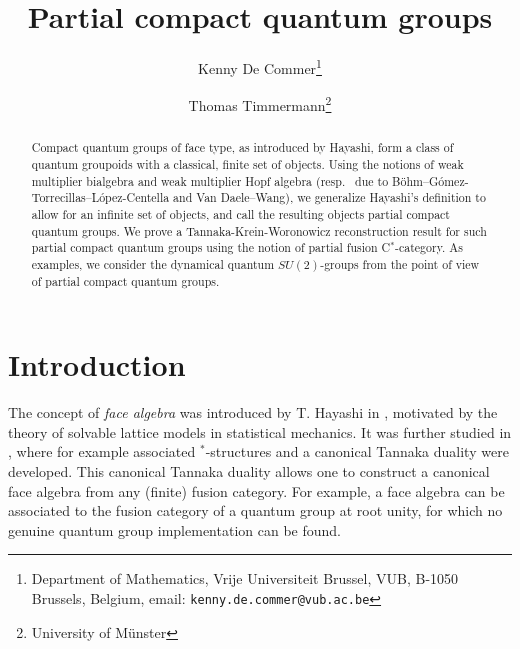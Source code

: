 \documentclass[10pt]{article}
\date{}
\theoremstyle{definition}
\numberwithin{equation}{section}
\begin{document}
\title{Partial compact quantum groups}

\author{Kenny De Commer\thanks{Department of Mathematics, Vrije Universiteit Brussel, VUB, B-1050 Brussels, Belgium, email: {\tt kenny.de.commer@vub.ac.be}}
\and Thomas Timmermann\thanks{University of M\"{u}nster}}

\maketitle

\begin{abstract}
\noindent Compact quantum groups of face type, as introduced by Hayashi, form a class of quantum groupoids with a classical, finite set of objects. Using the notions of weak multiplier bialgebra and weak multiplier Hopf algebra (resp.~ due to B{\"o}hm--G\'{o}mez-Torrecillas--L\'{o}pez-Centella and Van Daele--Wang), we generalize Hayashi's definition to allow for an infinite set of objects, and call the resulting objects partial compact quantum groups. We prove a Tannaka-Krein-Woronowicz reconstruction result for such partial compact quantum groups using the notion of partial fusion C$^*$-category. As examples, we consider the dynamical quantum $SU(2)$-groups from the point of view of partial compact quantum groups.
\end{abstract}







\tableofcontents


\section*{Introduction}

The concept of \emph{face algebra} was introduced by T. Hayashi in \cite{Hay2}, motivated by the theory of solvable lattice models in statistical mechanics. It was further studied in \cite{Hay1,Hay3,Hay4,Hay5,Hay6,Hay7,Hay8}, where for example associated $^*$-structures and a canonical Tannaka duality were developed. This canonical Tannaka duality allows one to construct a canonical face algebra from any (finite) fusion category. For example, a face algebra can be associated to the fusion category of a quantum group at root unity, for which no genuine quantum group implementation can be found. 
\end{document}
